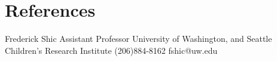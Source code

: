 \documentclass[11pt,letterpaper,roman]{moderncv} %
\begin{document}
\section{References}

\cventry{}
{Frederick Shic}
{\newline{}Assistant Professor}
{\newline{}University of Washington, and Seattle Children's Research Institute}{}
{
(206)884-8162
\newline{}fshic@uw.edu
}








\end{document}
